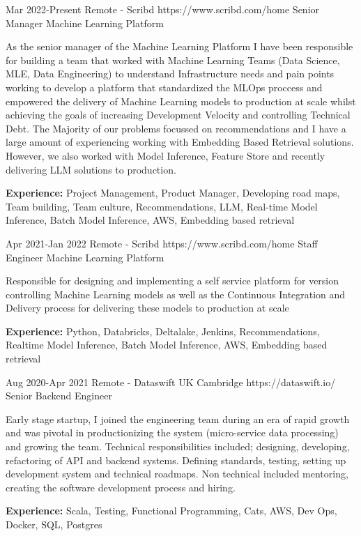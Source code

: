 \documentclass{article}
\begin{document}
\begin{job}
{Mar 2022-}{Present}
{Remote - Scribd}
{https://www.scribd.com/home}
{Senior Manager Machine Learning Platform}%
{As the senior manager of the Machine Learning Platform I have been responsible for building a team that worked with Machine Learning Teams (Data Science, MLE, Data Engineering) to understand Infrastructure needs and pain points working to develop a platform that standardized the MLOps proccess and empowered the delivery of Machine Learning models to production at scale whilst achieving the goals of increasing Development Velocity and controlling Technical Debt. The Majority of our problems focussed on recommendations and I have a large amount of experiencing working with Embedding Based Retrieval solutions. However, we also worked with Model Inference, Feature Store and recently delivering LLM solutions to production. \\
\rule{0mm}{5mm}\textbf{Experience:} Project Management, Product Manager, Developing road maps, Team building, Team culture, Recommendations, LLM, Real-time Model Inference, Batch Model Inference, AWS, Embedding based retrieval }
\end{job}


\begin{job}
{Apr 2021-}{Jan 2022}
{Remote - Scribd}
{https://www.scribd.com/home}
{Staff Engineer Machine Learning Platform}%
{Responsible for designing and implementing a self service platform for version controlling Machine Learning models as well as the Continuous Integration and Delivery process for delivering these models to production at scale \\
\rule{0mm}{5mm}\textbf{Experience:} Python, Databricks, Deltalake, Jenkins, Recommendations, Realtime Model Inference, Batch Model Inference, AWS, Embedding based retrieval }
\end{job}


\begin{job}
{Aug 2020-}{Apr 2021}
{Remote - Dataswift UK Cambridge}
{https://dataswift.io/}
{Senior Backend Engineer}%
{Early stage startup, I joined the engineering team during an era of rapid growth and was pivotal in productionizing the system (micro-service data processing) and growing the team. Technical responsibilities included; designing, developing, refactoring of API and backend systems. Defining standards, testing, setting up development system and technical roadmaps. Non technical included  mentoring, creating the software development process and hiring.  \\
\rule{0mm}{5mm}\textbf{Experience:} Scala, Testing, Functional Programming, Cats, AWS, Dev Ops, Docker, SQL, Postgres}
\end{job}
\end{document}
